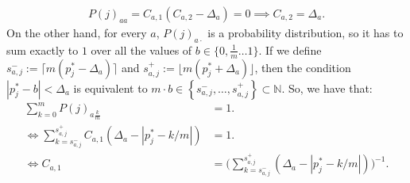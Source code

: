 \documentclass{article}
\begin{document}
\begin{align*}
	P(j)_{aa} = C_{a,1}(C_{a,2} - \Delta_a) = 0 \implies C_{a,2} = \Delta_a.
\end{align*}
On the other hand, for every $a$, $P(j)_{a \cdot}$ is a probability distribution, so it has to sum exactly to $1$ over all the values of $b \in \{0,\frac{1}{m} \dots 1\}$. If we define $s^-_{a,j} := \lceil m(p^*_j - \Delta_a) \rceil$ and $s^+_{a,j} := \lfloor m(p^*_j + \Delta_a) \rfloor$, then the condition $|p^*_j - b| < \Delta_a$ is equivalent to $m\cdot b \in \left\{s^-_{a,j} , \dots, s^+_{a,j}\right\} \subset \mathds{N}$. So, we have that:
\begin{align*}
	\sum\limits_{k = 0}^{m} P(j)_{a\frac{k}{m}} &= 1.\\
	\Longleftrightarrow \sum\limits_{k = s^{-}_{a,j}}^{s^{+}_{a,j}} C_{a,1}(\Delta_a -|p^*_j-k/m|) &= 1.\\
	\Longleftrightarrow C_{a,1} &= \bigg(\sum\limits_{k = s^-_{a,j}}^{s^+_{a,j}} (\Delta_a -|p^*_j-k/m|)\bigg)^{-1}.\\
\end{align*}
\end{document}

